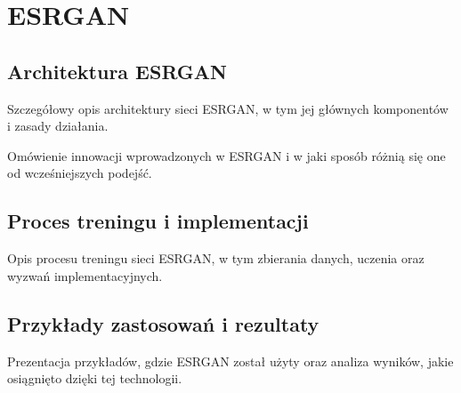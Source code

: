 \chapter{ESRGAN}




\cite{wang2018esrgan}








\section{Architektura ESRGAN}


Szczegółowy opis architektury sieci ESRGAN, w tym jej głównych komponentów i zasady działania.





Omówienie innowacji wprowadzonych w ESRGAN i w jaki sposób różnią się one od wcześniejszych podejść.



\section{Proces treningu i implementacji}


Opis procesu treningu sieci ESRGAN, w tym zbierania danych, uczenia oraz wyzwań implementacyjnych.



\section{Przykłady zastosowań i rezultaty}


Prezentacja przykładów, gdzie ESRGAN został użyty oraz analiza wyników, jakie osiągnięto dzięki tej technologii.